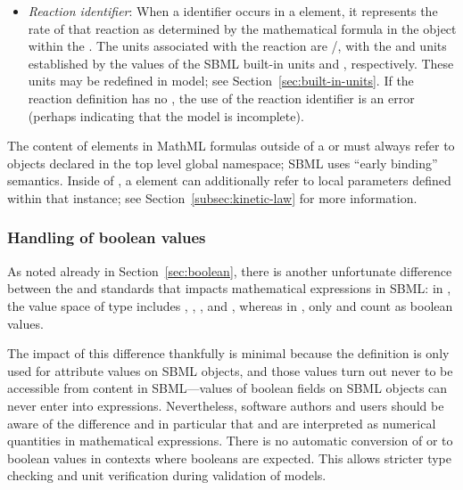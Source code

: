 \begin{itemize}
\begin{itemize}
  \item \emph{Reaction identifier}: When a \Reaction identifier
    occurs in a  element, it represents the rate of that
    reaction as determined by the mathematical formula in the
    \KineticLaw object within the \Reaction.  The units associated
    with the reaction are /,
    with the  and  units
    established by the values of the SBML built-in units
     and , respectively.  These units may
    be redefined in model; see Section~\ref{sec:built-in-units}.
    If the reaction definition has no \KineticLaw, the use of the
    reaction identifier is an error (perhaps indicating that the
    model is incomplete).

  \end{itemize}

\end{itemize}

The content of  elements in MathML formulas outside of a
\KineticLaw or \FunctionDefinition must always refer to objects
declared in the top level global namespace; \ie SBML uses ``early
binding'' semantics.  Inside of \KineticLaw, a  element
can additionally refer to local parameters defined within that
\KineticLaw instance; see Section~\ref{subsec:kinetic-law} for
more information.


\begin{blockChanged}

\subsubsection{Handling of boolean values}
\label{sec:handling-booleans}

As noted already in Section~\ref{sec:boolean}, there is another
unfortunate difference between the \xmlschema and \mathml
standards that impacts mathematical expressions in SBML: in
\xmlschemaone, the value space of type  includes
, , , and , whereas in
\mathmltwo, only  and  count as boolean
values.

The impact of this difference thankfully is minimal because the
\xmlschema definition is only used for attribute values on SBML
objects, and those values turn out never to be accessible from
\mathml content in SBML---values of boolean fields on SBML objects
can never enter into \mathml expressions.  Nevertheless, software
authors and users should be aware of the difference and in
particular that  and  are interpreted as numerical
quantities in mathematical expressions.  There is no automatic
conversion of  or  to boolean values in contexts
where booleans are expected.  This allows stricter type checking
and unit verification during validation of models.

\end{blockChanged}


